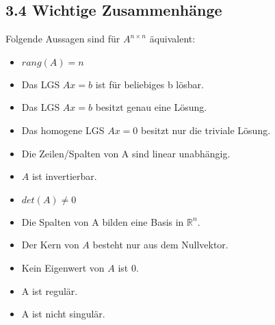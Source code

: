 \subsection{3.4 Wichtige Zusammenhänge}{
\vspace{-1pt}

Folgende Aussagen sind für $A^{n \times n}$ äquivalent:

\vspace{-5pt}
\begin{itemize}[leftmargin=0.29cm, itemsep=0pt]
\item $rang(A) = n$
\item Das LGS $Ax = b$ ist für beliebiges b lösbar.
\item Das LGS $Ax = b$ besitzt genau eine Lösung.
\item Das homogene LGS $Ax = 0$ besitzt nur die triviale Lösung.
\item Die Zeilen/Spalten von A sind linear unabhängig.
\item $A$ ist invertierbar.
\item $det(A) \neq 0$
\item Die Spalten von A bilden eine Basis in $\mathbb{R}^n$.
\item Der Kern von $A$ besteht nur aus dem Nullvektor.
\item Kein Eigenwert von $A$ ist 0.
\item A ist regulär.
\item A ist nicht singulär.
\end{itemize}
\vspace{-2.5mm}

}
\WhiteSpace
